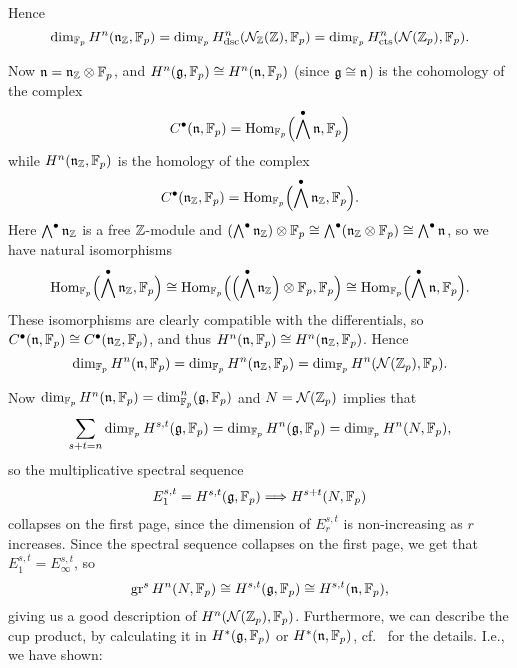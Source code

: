 Hence
\begin{equation*}
  \dim_{\mathbb{F}_p} H^{n}(\mathfrak{n}_{\mathbb{Z}},\mathbb{F}_p) = \dim_{\mathbb{F}_p} H_{\mathrm{dsc}}^n(\mathcal{N}_{\mathbb{Z}}(\mathbb{Z}),\mathbb{F}_p)= \dim_{\mathbb{F}_p} H_{\mathrm{cts}}^{n}(\mathcal{N}(\mathbb{Z}_p),\mathbb{F}_p).
\end{equation*}

Now $\mathfrak{n} = \mathfrak{n}_{\mathbb{Z}} \otimes \mathbb{F}_p$, and $H^n(\mathfrak{g},\mathbb{F}_p) \cong H^{n}(\mathfrak{n},\mathbb{F}_p)$ (since $\mathfrak{g} \cong \mathfrak{n}$) is the cohomology of the complex
\begin{equation*}
  C^\bullet(\mathfrak{n},\mathbb{F}_p) = \operatorname{Hom}_{\mathbb{F}_p}\Bigl( \bigwedge^\bullet \mathfrak{n},\mathbb{F}_p \Bigr)
\end{equation*}
while $H^{n}(\mathfrak{n}_{\mathbb{Z}},\mathbb{F}_p)$ is the homology of the complex
\begin{equation*}
  C^\bullet(\mathfrak{n}_{\mathbb{Z}},\mathbb{F}_p) = \operatorname{Hom}_{\mathbb{F}_p}\Bigl( \bigwedge^\bullet \mathfrak{n}_{\mathbb{Z}},\mathbb{F}_p \Bigr).
\end{equation*}
Here $\bigwedge^\bullet \mathfrak{n}_{\mathbb{Z}}$ is a free $\mathbb{Z}$-module and $(\bigwedge^\bullet \mathfrak{n}_{\mathbb{Z}}) \otimes \mathbb{F}_p \cong \bigwedge^\bullet (\mathfrak{n}_{\mathbb{Z}} \otimes \mathbb{F}_p) \cong \bigwedge^\bullet \mathfrak{n}$, so we have natural isomorphisms
\begin{equation*}
  \operatorname{Hom}_{\mathbb{F}_p}\Bigl( \bigwedge^\bullet \mathfrak{n}_{\mathbb{Z}},\mathbb{F}_p \Bigr) \cong \operatorname{Hom}_{\mathbb{F}_p}\Bigl( \Bigl( \bigwedge^\bullet \mathfrak{n}_{\mathbb{Z}} \Bigr) \otimes \mathbb{F}_p, \mathbb{F}_p \Bigr) \cong \operatorname{Hom}_{\mathbb{F}_p}\Bigl( \bigwedge^\bullet \mathfrak{n},\mathbb{F}_p \Bigr).
\end{equation*}
These isomorphisms are clearly compatible with the differentials, so $C^\bullet(\mathfrak{n},\mathbb{F}_p) \cong C^\bullet(\mathfrak{n}_{\mathbb{Z}},\mathbb{F}_p)$, and thus $H^n(\mathfrak{n},\mathbb{F}_p) \cong H^n(\mathfrak{n}_{\mathbb{Z}},\mathbb{F}_p)$. Hence
\begin{equation*}
  \dim_{\mathbb{F}_p} H^n(\mathfrak{n},\mathbb{F}_p) = \dim_{\mathbb{F}_p} H^n(\mathfrak{n}_{\mathbb{Z}},\mathbb{F}_p) = \dim_{\mathbb{F}_p} H^{n}(\mathcal{N}(\mathbb{Z}_p),\mathbb{F}_p).
\end{equation*}

Now $\dim_{\mathbb{F}_{p}} H^{n}(\mathfrak{n},\mathbb{F}_{p}) = \dim_{\mathbb{F}_{p}}^{n}(\mathfrak{g},\mathbb{F}_{p})$ and $N = \mathcal{N}(\mathbb{Z}_{p})$ implies that
\begin{equation*}
  \sum_{s+t = n} \dim_{\mathbb{F}_p} H^{s,t}(\mathfrak{g},\mathbb{F}_p) = \dim_{\mathbb{F}_p} H^n(\mathfrak{g},\mathbb{F}_p) = \dim_{\mathbb{F}_p} H^n(N,\mathbb{F}_p),
\end{equation*}
so the multiplicative spectral sequence
\begin{equation*}
  E_{1}^{s,t} = H^{s,t}(\mathfrak{g},\mathbb{F}_p) \Longrightarrow H^{s+t}(N,\mathbb{F}_p)
\end{equation*}
collapses on the first page, since the dimension of $E_{r}^{s,t}$ is non-increasing as $r$ increases. Since the spectral sequence collapses on the first page, we get that $E_{1}^{s,t} = E_{\infty}^{s,t}$, so
\begin{equation*}
  \operatorname{gr}^{s} H^{n}(N,\mathbb{F}_p) \cong H^{s,t}(\mathfrak{g},\mathbb{F}_p) \cong H^{s,t}(\mathfrak{n},\mathbb{F}_p),
\end{equation*}
giving us a good description of $H^n(\mathcal{N}(\mathbb{Z}_p),\mathbb{F}_p)$. Furthermore, we can describe the cup product, by calculating it in $H^{*}(\mathfrak{g},\mathbb{F}_{p})$ or $H^{*}(\mathfrak{n},\mathbb{F}_{p})$, cf.\  for the details. I.e., we have shown:

